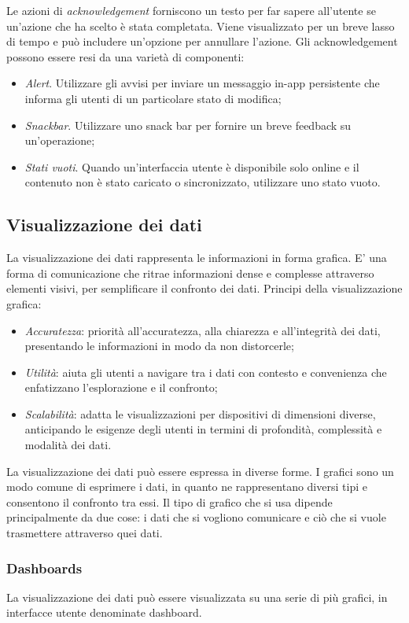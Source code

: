 \documentclass[12pt, a4paper]{report}
\begin{document}
	Le azioni di \textit{acknowledgement} forniscono un testo per far sapere all'utente se un'azione che ha scelto è stata completata. Viene visualizzato per un breve lasso di tempo e può includere un'opzione per annullare l'azione. Gli acknowledgement possono essere resi da una varietà di componenti:
	\begin{itemize}
		\item \textit{Alert}. Utilizzare gli avvisi per inviare un messaggio in-app persistente che informa gli utenti di un particolare stato di modifica;
		\item \textit{Snackbar}. Utilizzare uno snack bar per fornire un breve feedback su un'operazione;
		\item \textit{Stati vuoti}. Quando un'interfaccia utente è disponibile solo online e il contenuto non è stato caricato o sincronizzato, utilizzare uno stato vuoto.
	\end{itemize}

	\subsection{Visualizzazione dei dati}
	La visualizzazione dei dati rappresenta le informazioni in forma grafica. E’ una forma di comunicazione che ritrae informazioni dense e complesse attraverso elementi visivi, per semplificare il confronto dei dati. Principi della visualizzazione grafica:
	\begin{itemize}
		\item \textit{Accuratezza}: priorità all'accuratezza, alla chiarezza e all'integrità dei dati, presentando le informazioni in modo da non distorcerle;
		\item \textit{Utilità}: aiuta gli utenti a navigare tra i dati con contesto e convenienza che enfatizzano l'esplorazione e il confronto;
		\item \textit{Scalabilità}: adatta le visualizzazioni per dispositivi di dimensioni diverse, anticipando le esigenze degli utenti in termini di profondità, complessità e modalità dei dati.
	\end{itemize}
	La visualizzazione dei dati può essere espressa in diverse forme. I grafici sono un modo comune di esprimere i dati, in quanto ne rappresentano diversi tipi e consentono il confronto tra essi. Il tipo di grafico che si usa dipende principalmente da due cose: i dati che si vogliono comunicare e ciò che si vuole trasmettere attraverso quei dati.

	\subsubsection{Dashboards}
	La visualizzazione dei dati può essere visualizzata su una serie di più grafici, in interfacce utente denominate dashboard.
\end{document}
